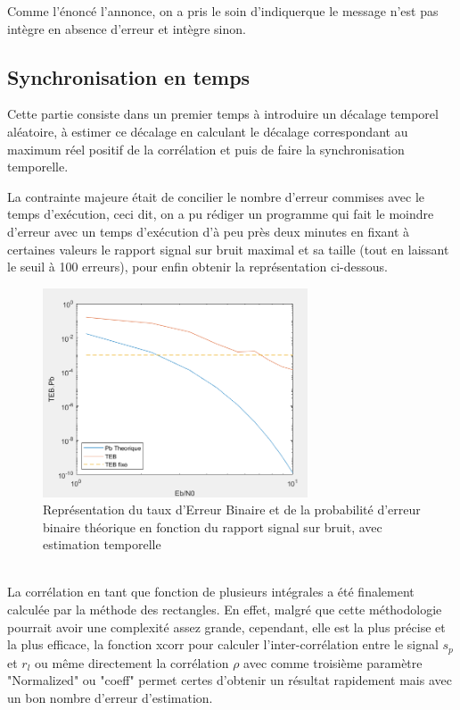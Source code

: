 \documentclass{rapport}
\begin{document}
{Comme l'énoncé l'annonce, on a pris le soin d'indiquerque le message n'est pas intègre en absence d'erreur et intègre sinon.
\subsection{\Large Synchronisation en temps}
Cette partie consiste dans un premier temps à introduire un décalage temporel aléatoire, à estimer ce décalage en calculant le décalage correspondant au maximum réel positif de la corrélation et puis de faire la synchronisation temporelle.
\vspace{5}

La contrainte majeure était de concilier le nombre d'erreur commises avec le temps d'exécution, ceci dit, on a pu rédiger un programme qui fait le moindre d'erreur avec un temps d'exécution d'à peu près deux minutes en fixant à certaines valeurs le rapport signal sur bruit maximal et sa taille (tout en laissant le seuil à 100 erreurs), pour enfin obtenir la représentation ci-dessous.

\begin{figure}[H]
    \centering
    \includegraphics[width=0.7\textwidth]{logos/TEB_Pb.PNG}
    \caption{Représentation du taux d’Erreur Binaire et de la probabilité d'erreur binaire théorique en fonction du rapport signal sur bruit, avec estimation temporelle}
\end{figure}\\

La corrélation en tant que fonction de plusieurs intégrales a été finalement calculée par la méthode des rectangles. En effet, malgré que cette méthodologie pourrait avoir une complexité assez grande, cependant, elle est la plus précise et la plus efficace, la fonction xcorr pour calculer l'inter-corrélation entre le signal $s_p$ et $r_l$ ou même directement la corrélation $\rho$ avec comme troisième paramètre "Normalized" ou "coeff" permet certes d'obtenir un résultat rapidement mais avec un bon nombre d'erreur d'estimation. 
\vspace{5}

}
\end{document}
